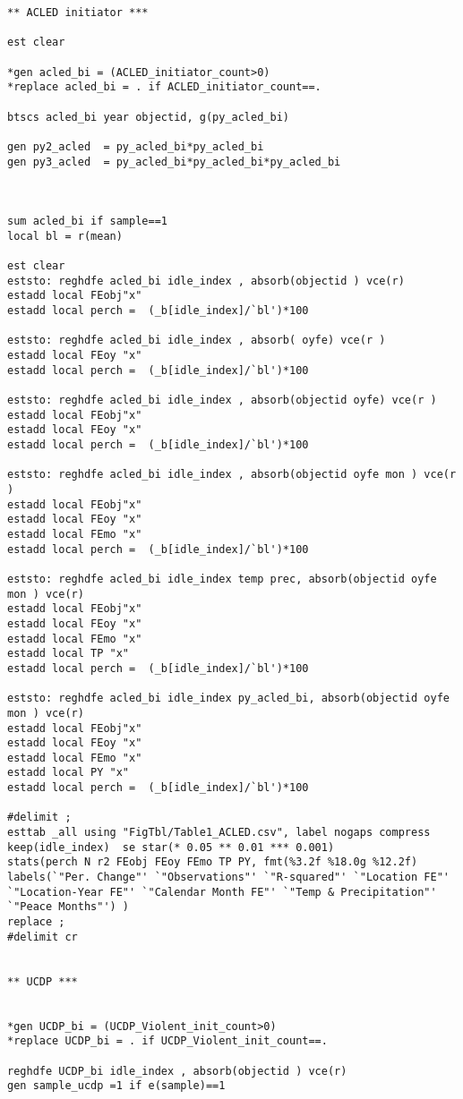 \documentclass[12pt,letterpaper]{article}
\begin{document}
\begin{lstlisting}
** ACLED initiator ***

est clear 

*gen acled_bi = (ACLED_initiator_count>0)
*replace acled_bi = . if ACLED_initiator_count==.

btscs acled_bi year objectid, g(py_acled_bi)

gen py2_acled  = py_acled_bi*py_acled_bi
gen py3_acled  = py_acled_bi*py_acled_bi*py_acled_bi



sum acled_bi if sample==1 
local bl = r(mean) 

est clear
eststo: reghdfe acled_bi idle_index , absorb(objectid ) vce(r)  
estadd local FEobj"x"
estadd local perch =  (_b[idle_index]/`bl')*100

eststo: reghdfe acled_bi idle_index , absorb( oyfe) vce(r )  
estadd local FEoy "x"
estadd local perch =  (_b[idle_index]/`bl')*100

eststo: reghdfe acled_bi idle_index , absorb(objectid oyfe) vce(r )  
estadd local FEobj"x"
estadd local FEoy "x"
estadd local perch =  (_b[idle_index]/`bl')*100

eststo: reghdfe acled_bi idle_index , absorb(objectid oyfe mon ) vce(r )  
estadd local FEobj"x"
estadd local FEoy "x"
estadd local FEmo "x"
estadd local perch =  (_b[idle_index]/`bl')*100

eststo: reghdfe acled_bi idle_index temp prec, absorb(objectid oyfe mon ) vce(r)  
estadd local FEobj"x"
estadd local FEoy "x"
estadd local FEmo "x"
estadd local TP "x"
estadd local perch =  (_b[idle_index]/`bl')*100

eststo: reghdfe acled_bi idle_index py_acled_bi, absorb(objectid oyfe mon ) vce(r)  
estadd local FEobj"x"
estadd local FEoy "x"
estadd local FEmo "x"
estadd local PY "x"
estadd local perch =  (_b[idle_index]/`bl')*100

#delimit ; 
esttab _all using "FigTbl/Table1_ACLED.csv", label nogaps compress 
keep(idle_index)  se star(* 0.05 ** 0.01 *** 0.001) 
stats(perch N r2 FEobj FEoy FEmo TP PY, fmt(%3.2f %18.0g %12.2f) labels(`"Per. Change"' `"Observations"' `"R-squared"' `"Location FE"' `"Location-Year FE"' `"Calendar Month FE"' `"Temp & Precipitation"' `"Peace Months"') )
replace ; 
#delimit cr 


** UCDP ***


*gen UCDP_bi = (UCDP_Violent_init_count>0)
*replace UCDP_bi = . if UCDP_Violent_init_count==.

reghdfe UCDP_bi idle_index , absorb(objectid ) vce(r)  
gen sample_ucdp =1 if e(sample)==1


\end{lstlisting}
\end{document}

